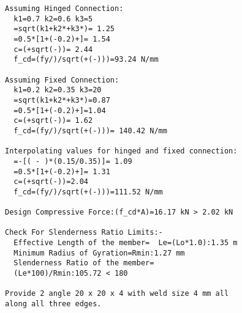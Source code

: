 \documentclass[preprint]{elsarticle}
\begin{document}
\begin{verbatim}
Assuming Hinged Connection:
  k1=0.7 k2=0.6 k3=5
  =sqrt(k1+k2*+k3*)= 1.25
  =0.5*[1+(-0.2)+]= 1.54
  c=(+sqrt(-))= 2.44
  f_cd=(fy/)/sqrt(+(-)))=93.24 N/mm 

Assuming Fixed Connection:
  k1=0.2 k2=0.35 k3=20
  =sqrt(k1+k2*+k3*)=0.87
  =0.5*[1+(-0.2)+]=1.04
  c=(+sqrt(-))= 1.62
  f_cd=(fy/)/sqrt(+(-)))= 140.42 N/mm 

Interpolating values for hinged and fixed connection:
  =-[( - )*(0.15/0.35)]= 1.09
  =0.5*[1+(-0.2)+]= 1.31
  c=(+sqrt(-))=2.04
  f_cd=(fy/)/sqrt(+(-)))=111.52 N/mm 

Design Compressive Force:(f_cd*A)=16.17 kN > 2.02 kN

Check For Slenderness Ratio Limits:- 
  Effective Length of the member=  Le=(Lo*1.0):1.35 m 
  Minimum Radius of Gyration=Rmin:1.27 mm
  Slenderness Ratio of the member= 
  (Le*100)/Rmin:105.72 < 180 

Provide 2 angle 20 x 20 x 4 with weld size 4 mm all 
along all three edges.
\end{verbatim}
\end{document}
